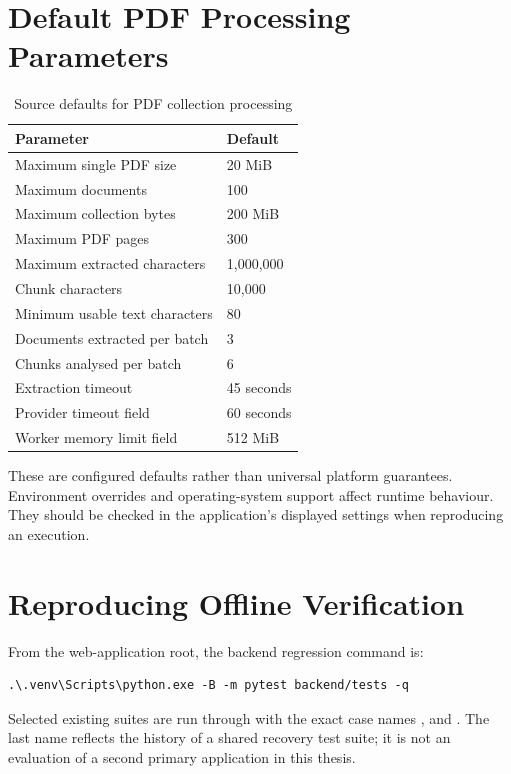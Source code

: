 \section{Default PDF Processing Parameters}
\begin{table}[htbp]\centering\small
\caption{Source defaults for PDF collection processing}\label{tab:pdf-defaults}
\begin{tabular}{P{0.54\textwidth}P{0.34\textwidth}}\toprule
Parameter & Default\\\midrule
Maximum single PDF size & 20 MiB\\
Maximum documents & 100\\
Maximum collection bytes & 200 MiB\\
Maximum PDF pages & 300\\
Maximum extracted characters & 1,000,000\\
Chunk characters & 10,000\\
Minimum usable text characters & 80\\
Documents extracted per batch & 3\\
Chunks analysed per batch & 6\\
Extraction timeout & 45 seconds\\
Provider timeout field & 60 seconds\\
Worker memory limit field & 512 MiB\\\bottomrule
\end{tabular}
\end{table}
These are configured defaults rather than universal platform guarantees. Environment overrides and operating-system support affect runtime behaviour. They should be checked in the application's displayed settings when reproducing an execution.

\section{Reproducing Offline Verification}
From the web-application root, the backend regression command is:
\begin{verbatim}
.\.venv\Scripts\python.exe -B -m pytest backend/tests -q
\end{verbatim}
Selected existing suites are run through  with the exact case names ,  and . The last name reflects the history of a shared recovery test suite; it is not an evaluation of a second primary application in this thesis.

